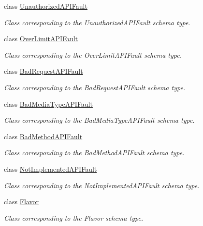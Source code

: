 \begin{DoxyCompactItemize}
class \hyperlink{classopenstack_1_1xml_1_1UnauthorizedAPIFault}{UnauthorizedAPIFault}
\begin{DoxyCompactList}\small\item\em Class corresponding to the UnauthorizedAPIFault schema type. \item\end{DoxyCompactList}\item 
class \hyperlink{classopenstack_1_1xml_1_1OverLimitAPIFault}{OverLimitAPIFault}
\begin{DoxyCompactList}\small\item\em Class corresponding to the OverLimitAPIFault schema type. \item\end{DoxyCompactList}\item 
class \hyperlink{classopenstack_1_1xml_1_1BadRequestAPIFault}{BadRequestAPIFault}
\begin{DoxyCompactList}\small\item\em Class corresponding to the BadRequestAPIFault schema type. \item\end{DoxyCompactList}\item 
class \hyperlink{classopenstack_1_1xml_1_1BadMediaTypeAPIFault}{BadMediaTypeAPIFault}
\begin{DoxyCompactList}\small\item\em Class corresponding to the BadMediaTypeAPIFault schema type. \item\end{DoxyCompactList}\item 
class \hyperlink{classopenstack_1_1xml_1_1BadMethodAPIFault}{BadMethodAPIFault}
\begin{DoxyCompactList}\small\item\em Class corresponding to the BadMethodAPIFault schema type. \item\end{DoxyCompactList}\item 
class \hyperlink{classopenstack_1_1xml_1_1NotImplementedAPIFault}{NotImplementedAPIFault}
\begin{DoxyCompactList}\small\item\em Class corresponding to the NotImplementedAPIFault schema type. \item\end{DoxyCompactList}\item 
class \hyperlink{classopenstack_1_1xml_1_1Flavor}{Flavor}
\begin{DoxyCompactList}\small\item\em Class corresponding to the Flavor schema type. \item\end{DoxyCompactList}\item 

\end{DoxyCompactItemize}
